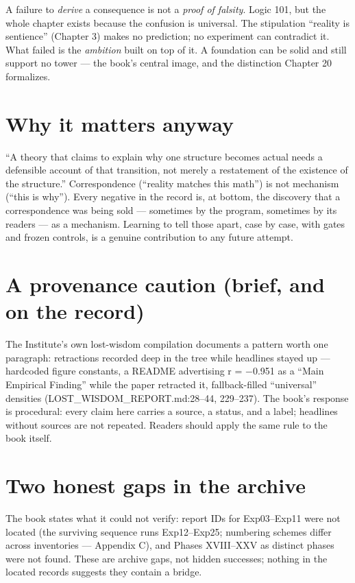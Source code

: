 \documentclass[
  11pt,
]{book}
\begin{document}
A failure to \emph{derive} a consequence is not a \emph{proof of
falsity}. Logic 101, but the whole chapter exists because the confusion
is universal. The stipulation ``reality is sentience'' (Chapter 3) makes
no prediction; no experiment can contradict it. What failed is the
\emph{ambition} built on top of it. A foundation can be solid and still
support no tower --- the book's central image, and the distinction
Chapter 20 formalizes.

\section{Why it matters anyway}\label{why-it-matters-anyway}

``A theory that claims to explain why one structure becomes actual needs
a defensible account of that transition, not merely a restatement of the
existence of the structure.'' Correspondence (``reality matches this
math'') is not mechanism (``this is why''). Every negative in the record
is, at bottom, the discovery that a correspondence was being sold ---
sometimes by the program, sometimes by its readers --- as a mechanism.
Learning to tell those apart, case by case, with gates and frozen
controls, is a genuine contribution to any future attempt.

\section{A provenance caution (brief, and on the
record)}\label{a-provenance-caution-brief-and-on-the-record}

The Institute's own lost-wisdom compilation documents a pattern worth
one paragraph: retractions recorded deep in the tree while headlines
stayed up --- hardcoded figure constants, a README advertising r =
−0.951 as a ``Main Empirical Finding'' while the paper retracted it,
fallback-filled ``universal'' densities (LOST\_WISDOM\_REPORT.md:28--44,
229--237). The book's response is procedural: every claim here carries a
source, a status, and a label; headlines without sources are not
repeated. Readers should apply the same rule to the book itself.

\section{Two honest gaps in the
archive}\label{two-honest-gaps-in-the-archive}

The book states what it could not verify: report IDs for Exp03--Exp11
were not located (the surviving sequence runs Exp12--Exp25; numbering
schemes differ across inventories --- Appendix C), and Phases XVIII--XXV
as distinct phases were not found. These are archive gaps, not hidden
successes; nothing in the located records suggests they contain a
bridge.
\end{document}
